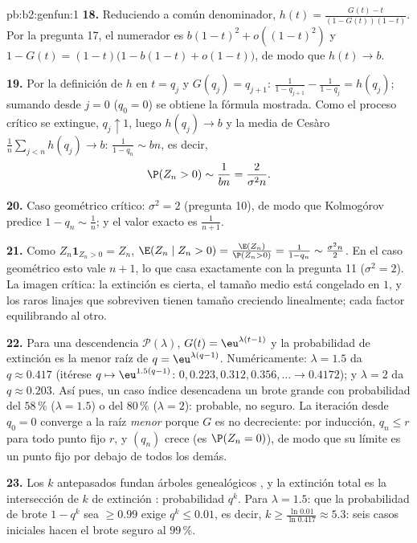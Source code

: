 \begin{solution}{pb:b2:genfun:1}
\textbf{18.} Reduciendo a común denominador, $h(t) = \frac{G(t) -
t}{(1 - G(t))(1 - t)}$. Por la pregunta 17, el numerador es $b(1-t)^2
+ o((1-t)^2)$ y $1 - G(t) = (1 - t)\bigl(1 - b(1-t) + o(1-t)\bigr)$,
de modo que $h(t) \to b$.

\textbf{19.} Por la definición de $h$ en $t = q_j$ y $G(q_j) =
q_{j+1}$: $\frac1{1 - q_{j+1}} - \frac1{1-q_j} = h(q_j)$; sumando
desde $j = 0$ ($q_0 = 0$) se obtiene la fórmula mostrada. Como el
proceso crítico se extingue, $q_j \uparrow 1$, luego $h(q_j) \to b$ y
la media de Cesàro $\frac1n\sum_{j<n}h(q_j) \to b$: $\frac1{1-q_n}
\sim bn$, es decir,
\[
\P(Z_n > 0) \sim \frac1{bn} = \frac{2}{\sigma^2 n} .
\]

\textbf{20.} Caso geométrico crítico: $\sigma^2 = 2$ (pregunta 10),
de modo que Kolmogórov predice $1 - q_n \sim \frac1n$; y el valor
exacto es $\frac1{n+1}$.

\textbf{21.} Como $Z_n\mathbf 1_{Z_n > 0} = Z_n$, $\E(Z_n \mid Z_n >
0) = \frac{\E(Z_n)}{\P(Z_n > 0)} = \frac1{1 - q_n} \sim
\frac{\sigma^2n}2$. En el caso geométrico esto vale $n + 1$, lo que
casa exactamente con la pregunta 11 ($\sigma^2 = 2$). La imagen
crítica: la extinción es cierta, el tamaño medio está congelado en
$1$, y los raros linajes que sobreviven tienen tamaño creciendo
linealmente; cada factor equilibrando al otro.

\textbf{22.} Para una descendencia $\mathcal P(\lambda)$, $G(t) =
\eu^{\lambda(t-1)}$ y la probabilidad de extinción es la menor raíz
de $q = \eu^{\lambda(q-1)}$. Numéricamente: $\lambda = 1.5$ da $q
\approx 0.417$ (itérese $q \mapsto \eu^{1.5(q-1)}$: $0, 0.223, 0.312,
0.356, \dots \to 0.4172$); y $\lambda = 2$ da $q \approx 0.203$. Así
pues, un caso índice desencadena un brote grande con probabilidad del
$58\,\%$ ($\lambda = 1.5$) o del $80\,\%$ ($\lambda = 2$): probable,
no seguro. La iteración desde $q_0 = 0$ converge a la raíz
\emph{menor} porque $G$ es no decreciente: por inducción, $q_n \leq
r$ para todo punto fijo $r$, y $(q_n)$ crece (es $\P(Z_n = 0)$), de
modo que su límite es un punto fijo por debajo de todos los demás.

\textbf{23.} Los $k$ antepasados fundan árboles genealógicos
, y la extinción total es la intersección de $k$
 de extinción : probabilidad $q^k$. Para
$\lambda = 1.5$: que la probabilidad de brote $1 - q^k$ sea $\geq
0.99$ exige $q^k \leq 0.01$, es decir, $k \geq \frac{\ln 0.01}{\ln
0.417} \approx 5.3$: seis casos iniciales hacen el brote seguro al
$99\,\%$.


\end{solution}
